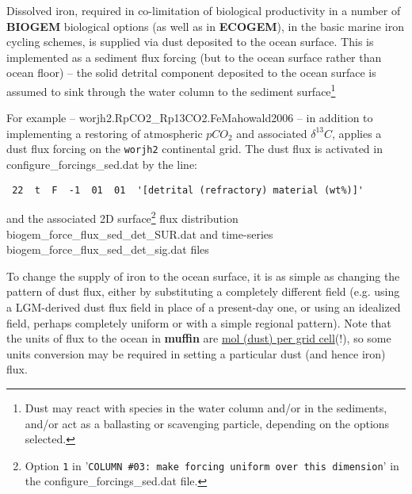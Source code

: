 \documentclass[11pt,fleqn]{book} %
\begin{document}
Dissolved iron, required in co-limitation of biological productivity in a number of \textbf{BIOGEM} biological options (as well as in \textbf{ECOGEM}), in the basic marine iron cycling schemes, is supplied via dust deposited to the ocean surface. This is implemented as a sediment flux forcing (but to the ocean surface rather than ocean floor) -- the solid detrital component deposited to the ocean surface is assumed to sink through the water column to the sediment surface\footnote{Dust may react with species in the water column and/or in the sediments, and/or act as a ballasting or scavenging particle, depending on the options selected.} 

For example -- \textsf{\footnotesize worjh2.RpCO2\_Rp13CO2.FeMahowald2006} -- in addition to implementing a restoring of atmospheric \(pCO_{2}\) and associated \(\delta ^{13}C\), applies a dust flux forcing on the \texttt{worjh2} continental grid. The dust flux is activated in \textsf{\footnotesize configure\_forcings\_sed.dat} by the line:
\vspace{-1mm}\begin{verbatim}
 22  t  F  -1  01  01  '[detrital (refractory) material (wt%)]'
\end{verbatim}\vspace{-1mm}
and the associated 2D surface\footnote{Option \texttt{1} in '\texttt{COLUMN \#03: make forcing uniform over this dimension}' in the \textsf{\scriptsize configure\_forcings\_sed.dat} file.} flux distribution \textsf{\footnotesize biogem\_force\_flux\_sed\_det\_SUR.dat} and time-series \textsf{\footnotesize biogem\_force\_flux\_sed\_det\_sig.dat} files

To change the supply of iron to the ocean surface, it is as simple as changing the pattern of dust flux, either by substituting a completely different field (e.g. using a LGM-derived dust flux field in place of a present-day one, or using an idealized field, perhaps completely uniform or with a simple regional pattern). Note that the units of flux to the ocean in \textbf{muffin} are \uline{mol (dust) per grid cell}(!), so some units conversion may be required in setting a particular dust (and hence iron) flux.
\end{document}
